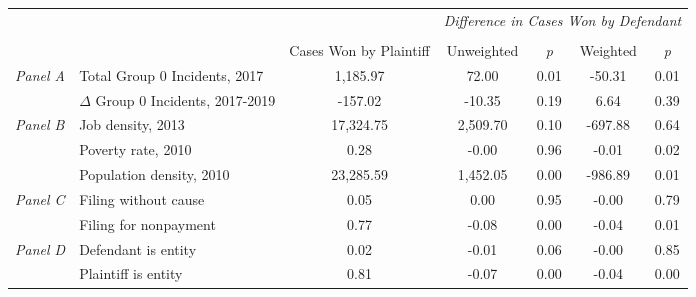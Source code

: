 \begin{tabular}{llccccc}
\toprule
 &  & \textit{} & \multicolumn{4}{c}{\textit{Difference in Cases Won by Defendant}} \\
\cline{4-7}
\\
 &  & Cases Won by Plaintiff & Unweighted & \emph{p} & Weighted & \emph{p} \\
\midrule
\multirow[c]{2}{3cm}{\textit{Panel A}} & Total Group 0 Incidents, 2017 & 1,185.97 & 72.00 & 0.01 & -50.31 & 0.01 \\
 & $\Delta$ Group 0 Incidents, 2017-2019 & -157.02 & -10.35 & 0.19 & 6.64 & 0.39 \\
\cline{1-7}
\multirow[c]{3}{3cm}{\textit{Panel B}} & Job density, 2013 & 17,324.75 & 2,509.70 & 0.10 & -697.88 & 0.64 \\
 & Poverty rate, 2010 & 0.28 & -0.00 & 0.96 & -0.01 & 0.02 \\
 & Population density, 2010 & 23,285.59 & 1,452.05 & 0.00 & -986.89 & 0.01 \\
\cline{1-7}
\multirow[c]{2}{3cm}{\textit{Panel C}} & Filing without cause & 0.05 & 0.00 & 0.95 & -0.00 & 0.79 \\
 & Filing for nonpayment & 0.77 & -0.08 & 0.00 & -0.04 & 0.01 \\
\cline{1-7}
\multirow[c]{2}{3cm}{\textit{Panel D}} & Defendant is entity & 0.02 & -0.01 & 0.06 & -0.00 & 0.85 \\
 & Plaintiff is entity & 0.81 & -0.07 & 0.00 & -0.04 & 0.00 \\
\cline{1-7}
\bottomrule
\end{tabular}
